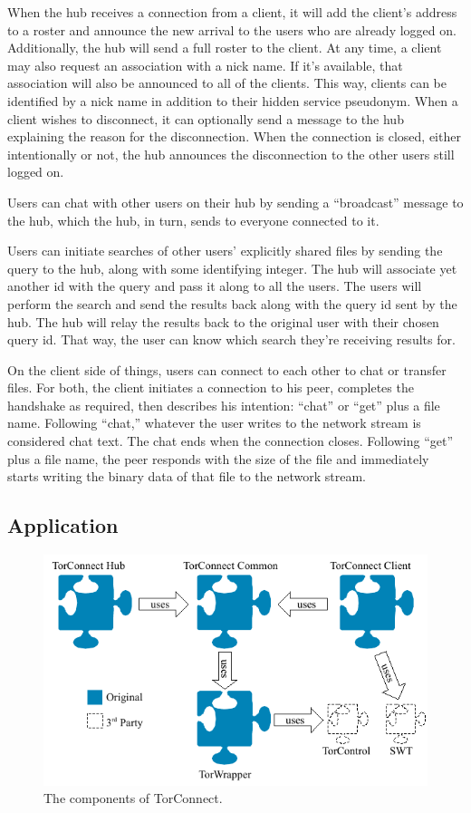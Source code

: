 \documentclass{article}
\begin{document}
When the hub receives a connection from a client, it will add the client's address to a roster and announce the new arrival to the users who are already logged on.  Additionally, the hub will send a full roster to the client.  At any time, a client may also request an association with a nick name.  If it's available, that association will also be announced to all of the clients.  This way, clients can be identified by a nick name in addition to their hidden service pseudonym.  When a client wishes to disconnect, it can optionally send a message to the hub explaining the reason for the disconnection.  When the connection is closed, either intentionally or not, the hub announces the disconnection to the other users still logged on.

Users can chat with other users on their hub by sending a ``broadcast'' message to the hub, which the hub, in turn, sends to everyone connected to it.

Users can initiate searches of other users' explicitly shared files by sending the query to the hub, along with some identifying integer.  The hub will associate yet another id with the query and pass it along to all the users.  The users will perform the search and send the results back along with the query id sent by the hub.  The hub will relay the results back to the original user with their chosen query id.   That way, the user can know which search they're receiving results for.

On the client side of things, users can connect to each other to chat or transfer files.  For both, the client initiates a connection to his peer, completes the handshake as required, then describes his intention: ``chat'' or ``get'' plus a file name.  Following ``chat,'' whatever the user writes to the network stream is considered chat text.  The chat ends when the connection closes.  Following ``get'' plus a file name, the peer responds with the size of the file and immediately starts writing the binary data of that file to the network stream.

\subsection{Application}
\begin{figure}
\centering
\includegraphics{architecture.pdf}
\caption{The components of TorConnect.}
\label{fig:architecture}
\end{figure}
\end{document}
